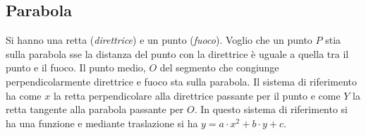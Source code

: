 \documentclass[a4paper,12pt, oneside]{book}
\begin{document}
\subsection{Parabola}
\begin{definizione}
Si hanno una retta (\textit{direttrice}) e un punto (\textit{fuoco}). Voglio che un punto $P$ stia sulla parabola sse la distanza del punto con la direttrice è uguale a quella tra il punto e il fuoco. Il punto medio, $O$ del segmento che congiunge perpendicolarmente direttrice e fuoco sta sulla parabola. Il sistema di riferimento ha come $x$ la retta perpendicolare alla direttrice passante per il punto e come $Y$ la retta tangente alla parabola passante per $O$. In questo sistema di riferimento si ha una funzione e mediante traslazione si ha $y=a\cdot x^2+b\cdot y+c$.\\
~
\end{definizione}
\end{document}
